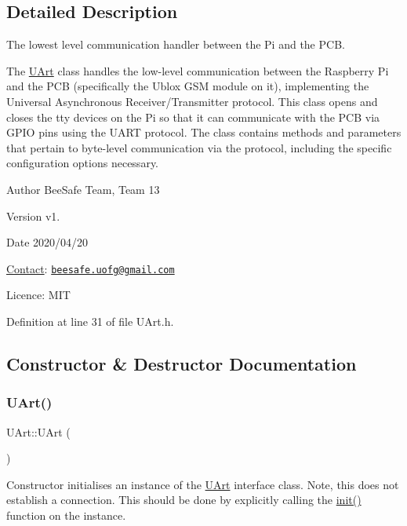\subsection{Detailed Description}
The lowest level communication handler between the Pi and the P\+CB. 

The \hyperlink{class_u_art}{U\+Art} class handles the low-\/level communication between the Raspberry Pi and the P\+CB (specifically the Ublox G\+SM module on it), implementing the Universal Asynchronous Receiver/\+Transmitter protocol. This class opens and closes the tty devices on the Pi so that it can communicate with the P\+CB via G\+P\+IO pins using the U\+A\+RT protocol. The class contains methods and parameters that pertain to byte-\/level communication via the protocol, including the specific configuration options necessary.

\begin{DoxyAuthor}{Author}
Bee\+Safe Team, Team 13
\end{DoxyAuthor}
\begin{DoxyVersion}{Version}
v1.
\end{DoxyVersion}
\begin{DoxyDate}{Date}
2020/04/20
\end{DoxyDate}
\hyperlink{class_contact}{Contact}\+: \href{mailto:beesafe.uofg@gmail.com}{\tt beesafe.\+uofg@gmail.\+com}

Licence\+: M\+IT 

Definition at line 31 of file U\+Art.\+h.



\subsection{Constructor \& Destructor Documentation}
\mbox{\label{class_u_art_a2704c05ac50a1817a56d74010f18057a}} 
\subsubsection{\texorpdfstring{U\+Art()}{UArt()}}
{\footnotesize\ttfamily U\+Art\+::\+U\+Art (\begin{DoxyParamCaption}{ }\end{DoxyParamCaption})}

Constructor initialises an instance of the \hyperlink{class_u_art}{U\+Art} interface class. Note, this does not establish a connection. This should be done by explicitly calling the \hyperlink{class_u_art_a51adaa81c08d92599768c0303e5abc94}{init()} function on the instance. 

